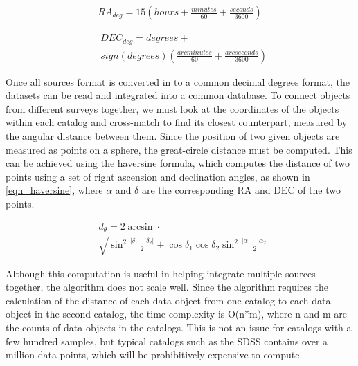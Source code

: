 \documentclass[11pt,sigconf]{acmart}
\begin{document}
\begin{equation} \label{eqn_ra}
  \begin{split}
    RA_{deg}= 15(hours + \frac{minutes}{60} + \frac{seconds}{3600}) 
  \end{split}
\end{equation}

\begin{equation} \label{eqn_dec}
  \begin{split}
  & DEC_{deg}= degrees+ \\
  & sign(degrees)(\frac{arcminutes}{60} + \frac{arcseconds}{3600})
  \end{split}
\end{equation}

Once all sources format is converted in to a common decimal degrees format, the 
datasets can be read and integrated into a common database. To connect objects 
from different surveys together, we must look at the coordinates of the
objects within each catalog and cross-match to find its closest counterpart, 
measured by the angular distance between them. Since the position of two given 
objects are measured as points on a sphere, the great-circle distance must be 
computed. This can be achieved using the haversine formula, which computes the 
distance of two points using a set of right ascension and declination angles, 
as shown in \ref{eqn_haversine}, where $\alpha$ and $\delta$ are the corresponding
RA and DEC of the two points.

\begin{equation} \label{eqn_haversine}
  \begin{split}
   & d_{\theta} = 2 \arcsin \cdot \\
   & {\sqrt{\sin^2\frac{\left| \delta_1 - \delta_2 \right|}{2} + \cos{\delta_1}\cos{\delta_2}\sin^2\frac{\left| \alpha_1 - \alpha_2 \right|}{2}}}  
  \end{split}
\end{equation}

Although this computation is useful in helping integrate multiple sources together, 
the algorithm does not scale well. Since the algorithm requires the calculation of
the distance of each data object from one catalog to each data object in the second
catalog, the time complexity is O(n*m), where n and m are the counts of data objects
in the catalogs. This is not an issue for catalogs with a few hundred samples,
but typical catalogs such as the SDSS contains over a million data points, which will
be prohibitively expensive to compute.
\end{document}
